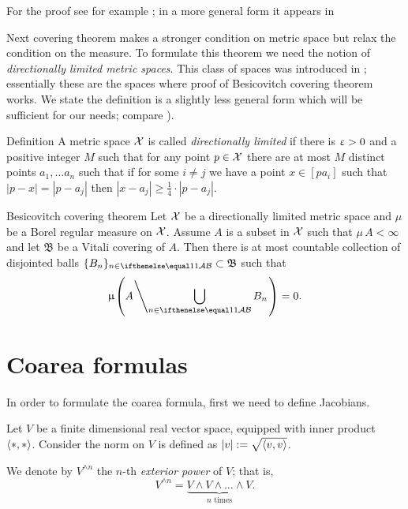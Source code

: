 For the proof see for example \cite[Theorem 1.6]{heinonen};
in a more general form it appears in \cite[Section 2.8]{federer}

Next covering theorem makes a stronger condition on metric space
but relax the condition on the measure.
To formulate this theorem we need 
the notion of \emph{directionally limited metric spaces}.
This class of spaces was introduced in \cite[2.8.9]{federer};
essentially these are the spaces where proof of Besicovitch covering theorem
works.
We state the definition is a slightly less general form which will be sufficient for our needs;
compare \cite[page 7]{heinonen}).

\begin{thm}{Definition}\label{def:directionally-limited}
A metric space $\mathcal{X}$
is called \emph{directionally limited}
if there is $\upvarepsilon>0$ and a positive integer $M$
such that for any point $p\in \spc{X}$
there are at most $M$ distinct points $a_1,\dots a_n$
such that if for some $i\ne j$ we have a point $x\in [pa_i]$ such that $|p-x|=|p-a_j|$
then $|x-a_j|\ge\tfrac14\cdot|p-a_j|$.
\end{thm}



\begin{thm}{Besicovitch covering theorem}
Let $\mathcal{X}$ be a directionally limited metric space 
and $\mu$ be a Borel regular measure on $\mathcal{X}$.
Assume $A$ is a subset in $\mathcal{X}$ such that $\mu\, A<\infty$
and let $\mathfrak{B}$ be a Vitali covering of $A$.
Then there is at most countable collection of disjointed balls 
$\{B_n\}_{n\in\IndexSet}\subset\mathfrak{B}$ such that
$$\mu\l(A\l\backslash\bigcup_{n\in\IndexSet}B_n\r.\r)=0.$$

\end{thm}

\section{Coarea formulas}\label{sec:coarea-prelim}

In order to formulate the coarea formula,
first we need to define Jacobians.


Let $V$ be a finite dimensional real vector space, equipped with inner product $\langle{*},{*}\rangle$.
Consider the norm on $V$ is defined as $|v|:=\sqrt{\langle v,v\rangle}$.

We denote by $V^{\wedge n}$ the $n$-th \emph{exterior power} of $V$;
that is,
\[V^{\wedge n}=\underbrace{V\wedge V\wedge\dots\wedge V}_{\mbox{$n$ times}}.\]

